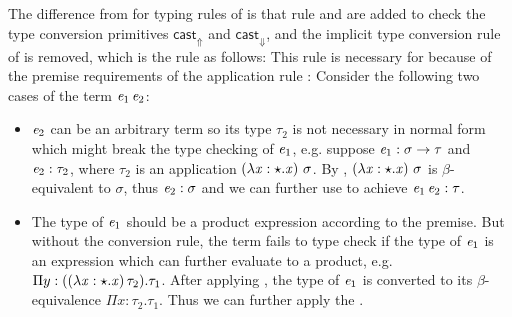 The difference from \cc for typing rules of \expcc is that rule  and  are added to check the type conversion primitives $ \mathsf{cast}_{\Uparrow} $ and $ \mathsf{cast}_{\Downarrow} $, and the implicit type conversion rule of \cc is removed, which is the rule as follows:
\ottusedrule{\ottdruleTccXXConv{}}
This rule is necessary for \cc because of the premise requirements of the application rule :
\ottusedrule{\ottdruleTXXApp{}}
Consider the following two cases of the term $\mathit{e_{{\mathrm{1}}}} \, \mathit{e_{{\mathrm{2}}}}$:
\begin{itemize}
\item $\mathit{e_{{\mathrm{2}}}}$ can be an arbitrary term so its type $\tau_{{\mathrm{2}}}$ is not necessary in normal form which might break the type checking of $\mathit{e_{{\mathrm{1}}}}$, e.g. suppose $\mathit{e_{{\mathrm{1}}}}:\sigma  \rightarrow  \tau$ and $\mathit{e_{{\mathrm{2}}}} : \tau_{{\mathrm{2}}}$, where $\tau_{{\mathrm{2}}}$ is an application $(\lambda  \mathit{x}  :  \star  .  \mathit{x})~\sigma$. By , $(\lambda  \mathit{x}  :  \star  .  \mathit{x})~\sigma$ is $\beta$-equivalent to $\sigma$, thus $\mathit{e_{{\mathrm{2}}}} : \sigma$ and we can further use  to achieve $\mathit{e_{{\mathrm{1}}}} \, \mathit{e_{{\mathrm{2}}}} : \tau$.
\item The type of $\mathit{e_{{\mathrm{1}}}}$ should be a product expression according to the premise. But without the conversion rule, the term fails to type check if the type of $\mathit{e_{{\mathrm{1}}}}$ is an expression which can further evaluate to a product, e.g. $ \Pi  y:((  \lambda  \mathit{x}  :  \star  .  \mathit{x}  ) \, \tau_{{\mathrm{2}}}).\tau_{{\mathrm{1}}}$. After applying , the type of $\mathit{e_{{\mathrm{1}}}}$ is converted to its $\beta$-equivalence $ \Pi  x:\tau_{{\mathrm{2}}}.\tau_{{\mathrm{1}}}$. Thus we can further apply the .
\end{itemize}

